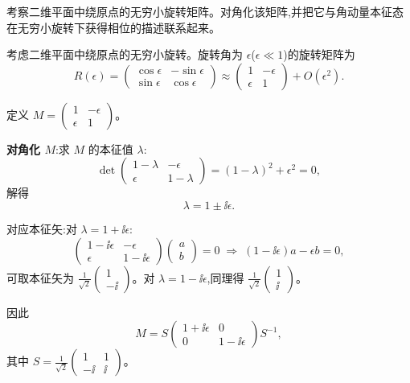 \begin{question}
考察二维平面中绕原点的无穷小旋转矩阵。对角化该矩阵,并把它与角动量本征态在无穷小旋转下获得相位的描述联系起来。
\begin{solution}
	考虑二维平面中绕原点的无穷小旋转。旋转角为 $\epsilon$($\epsilon\ll1$)的旋转矩阵为
	\[
	R(\epsilon)=\begin{pmatrix}\cos\epsilon&-\sin\epsilon\\ \sin\epsilon&\cos\epsilon\end{pmatrix}
	\approx\begin{pmatrix}1&-\epsilon\\ \epsilon&1\end{pmatrix}+O(\epsilon^2).
	\]

	定义 $M=\begin{pmatrix}1&-\epsilon\\ \epsilon&1\end{pmatrix}$。

	\textbf{对角化 $M$}:求 $M$ 的本征值 $\lambda$:
	\[
	\det\begin{pmatrix}1-\lambda&-\epsilon\\ \epsilon&1-\lambda\end{pmatrix}
	=(1-\lambda)^2+\epsilon^2=0,
	\]
	解得
	\[
	\lambda = 1\pm \ii\epsilon.
	\]

	对应本征矢:对 $\lambda=1+\ii\epsilon$:
	\[
	\begin{pmatrix}1-\ii\epsilon&-\epsilon\\ \epsilon&1-\ii\epsilon\end{pmatrix}\begin{pmatrix}a\\b\end{pmatrix}=0
	\;\Longrightarrow\; (1-\ii\epsilon)a-\epsilon b=0,
	\]
	可取本征矢为 $\frac{1}{\sqrt{2}}\begin{pmatrix}1\\ -\ii\end{pmatrix}$。对 $\lambda=1-\ii\epsilon$,同理得 $\frac{1}{\sqrt{2}}\begin{pmatrix}1\\ \ii\end{pmatrix}$。

	因此
	\[
	M = S\begin{pmatrix}1+\ii\epsilon&0\\0&1-\ii\epsilon\end{pmatrix}S^{-1},
	\]
	其中 $S=\frac{1}{\sqrt{2}}\begin{pmatrix}1&1\\ -\ii&\ii\end{pmatrix}$。


\end{solution}
\end{question}
